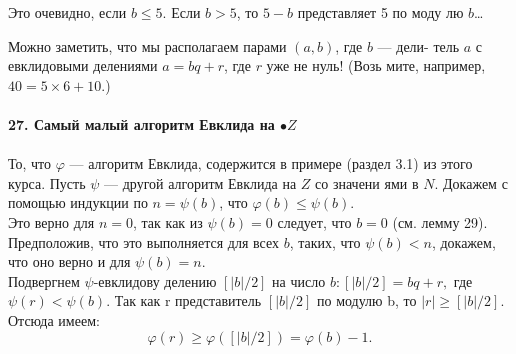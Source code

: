 



%
\noindent Это очевидно, если $b \leqslant 5$. Если $b > 5$,  то $5 - b$  представляет 5 по моду­\linebreak
лю $b$\ldots

Можно заметить, что мы располагаем парами $(a,b)$, где $b$ --- дели-\linebreak
тель $a$  с евклидовыми делениями $a = bq + r$, где $r$ уже не нуль! (Возь­\linebreak
мите, например, $40 = 5 \times 6 + 10$.)\\
\\
\noindent\textbf{27. Самый малый алгоритм Евклида на $\mathbb{•}{Z}$}\\
\\
\hspace*{15pt}То, что $\varphi$ ---  алгоритм Евклида, содержится в примере (раздел 3.1)\linebreak
из этого курса. Пусть $\psi$ --- другой алгоритм Евклида на $Z$  со значени­\linebreak
ями в $N$. Докажем с помощью индукции по $n =\psi(b)$, что $\varphi(b) \leqslant \psi(b)$.\\
\hspace*{15pt}Это верно для $n = 0$, так как из $\psi(b) = 0$ следует, что $b = 0$\linebreak
(см. лемму 29). Предположив, что это выполняется для всех $b$, таких,\linebreak
что $\psi(b) < n$,  докажем, что оно верно и для $\psi(b) = n$.\\
\hspace*{15pt}Подвергнем $\psi$-евклидову делению $[|b|/2]$ на число $b:[|b|/2] = bq+r,$\linebreak
где $\psi(r) < \psi(b)$. Так как r  представитель $[|b|/2]$ по модулю  b, то \linebreak
$|r| \geqslant [|b|/2]$. Отсюда имеем: 
$$\varphi(r) \geqslant \varphi([|b|/2]) = \varphi(b) - 1.$$
